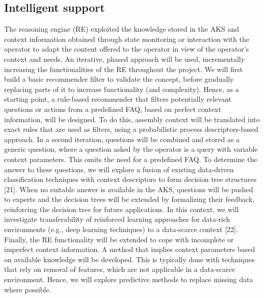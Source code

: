 \subsection{Intelligent support}

The reasoning engine (RE) exploited the knowledge stored in the AKS and context information obtained through state monitoring or interaction with the operator to adapt the content offered to the operator in view of the operator's context and needs. 
An iterative, phased approach will be used, incrementally increasing the functionalities of the RE throughout the project. 
We will first build a basic recommender filter to validate the concept, before gradually replacing parts of it to increase functionality (and complexity). Hence, as a starting point, a rule-based recommender that filters potentially relevant questions or actions from a predefined FAQ, based on perfect context information, will be designed. To do this, assembly context will be translated into exact rules that are used as filters, using a probabilistic process descriptors-based approach. 
In a second iteration, questions will be combined and stored as a generic question, where a question asked by the operator is a query with variable context parameters. This omits the need for a predefined FAQ. To determine the answer to these questions, we will explore a fusion of existing data-driven classification techniques with context descriptors to form decision tree structures [21]. When no suitable answer is available in the AKS, questions will be pushed to experts and the decision trees will be extended by formalizing their feedback, reinforcing the decision tree for future applications.
In this context, we will investigate transferability of reinforced learning approaches for data-rich environments (e.g., deep learning techniques) to a data-scarce context [22]. Finally, the RE functionality will be extended to cope with incomplete or imperfect context information. A method that implies context parameters based on available knowledge will be developed. This is typically done with techniques that rely on removal of features, which are not applicable in a data-scarce environment. Hence, we will explore predictive methods to replace missing data where possible.
